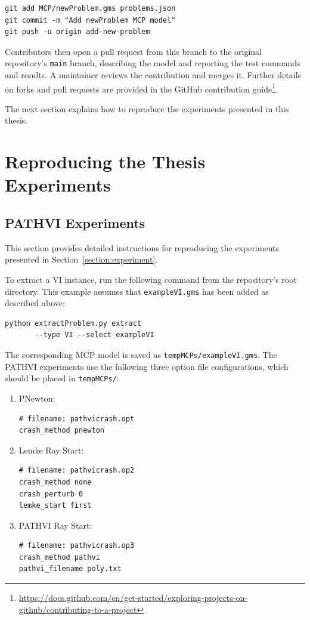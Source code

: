 \begin{verbatim}
git add MCP/newProblem.gms problems.json
git commit -m "Add newProblem MCP model"
git push -u origin add-new-problem
\end{verbatim}

Contributors then open a pull request from this branch to the original repository's \texttt{main} branch, describing the model and reporting the test commands and results. A maintainer reviews the contribution and merges it. Further details on forks and pull requests are provided in the GitHub contribution guide\footnote{\url{https://docs.github.com/en/get-started/exploring-projects-on-github/contributing-to-a-project}}.

The next section explains how to reproduce the experiments presented in this thesis.

\section{Reproducing the Thesis Experiments}

\subsection{PATHVI Experiments}

This section provides detailed instructions for reproducing the experiments presented in Section~\ref{section:experiment}.

To extract a VI instance, run the following command from the repository's root directory. This example assumes that \texttt{exampleVI.gms} has been added as described above:

\begin{verbatim}
python extractProblem.py extract 
       --type VI --select exampleVI
\end{verbatim}

The corresponding MCP model is saved as \texttt{tempMCPs/exampleVI.gms}. The PATHVI experiments use the following three option file configurations, which should be placed in \texttt{tempMCPs/}:

\begin{enumerate}
    \item PNewton:

\begin{verbatim}
# filename: pathvicrash.opt
crash_method pnewton
\end{verbatim}

    \item Lemke Ray Start:

\begin{verbatim}
# filename: pathvicrash.op2
crash_method none
crash_perturb 0
lemke_start first
\end{verbatim}

    \item PATHVI Ray Start:

\begin{verbatim}
# filename: pathvicrash.op3
crash_method pathvi
pathvi_filename poly.txt
\end{verbatim}
\end{enumerate}

